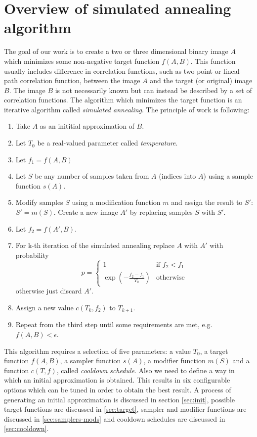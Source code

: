 \documentclass[preprint,amsmath,amssymb,aps,pre]{revtex4-1}
\begin{document}
\section{Overview of simulated annealing algorithm}
\label{sec:annealing}
The goal of our work is to create a two or three dimensional binary image $A$
which minimizes some non-negative target function $f(A, B)$. This function
usually includes difference in correlation functions, such as two-point or
lineal-path correlation function, between the image $A$ and the target (or
original) image $B$. The image $B$ is not necessarily known but can instead be
described by a set of correlation functions. The algorithm which minimizes the
target function is an iterative algorithm called \textit{simulated
  annealing}. The principle of work is following:
\begin{enumerate}
\item Take $A$ as an inititial approximation of $B$.
\item Let $T_0$ be a real-valued parameter called \textit{temperature}.
\item Let $f_1 = f(A, B)$
\item Let $S$ be any number of samples taken from $A$ (indices into $A$) using
  a sample function $s(A)$.
\item Modify samples $S$ using a modification function $m$ and assign the result
  to $S'$: $S' = m(S)$. Create a new image $A'$ by replacing samples $S$ with
  $S'$.
\item Let $f_2 = f(A', B)$.
\item For k-th iteration of the simulated annealing replace $A$ with $A'$ with
  probability
  \begin{equation*}
    p =
    \begin{cases}
      1 & \text{if } f_2 < f_1 \\
      \exp(-\frac{f_2 - f_1}{T_k}) & \text{otherwise}
    \end{cases}
  \end{equation*}
  otherwise just discard $A'$.
\item Assign a new value $c(T_k, f_2)$ to $T_{k+1}$.
\item Repeat from the third step until some requirements are met, e.g.
  $f(A, B) < \epsilon$.
\end{enumerate}
This algorithm requires a selection of five parameters: a value $T_0$, a target
function $f(A, B)$, a sampler function $s(A)$, a modifier function $m(S)$ and a
function $c(T, f)$, called \textit{cooldown schedule}. Also we need to define a
way in which an initial approximation is obtained. This results in six
configurable options which can be tuned in order to obtain the best result. A
process of generating an initial approximation is discussed in section
\cref{sec:init}, possible target functions are discussed in \cref{sec:target},
sampler and modifier functions are discussed in \cref{sec:samplers-mods} and
cooldown schedules are discussed in \cref{sec:cooldown}.
\end{document}
